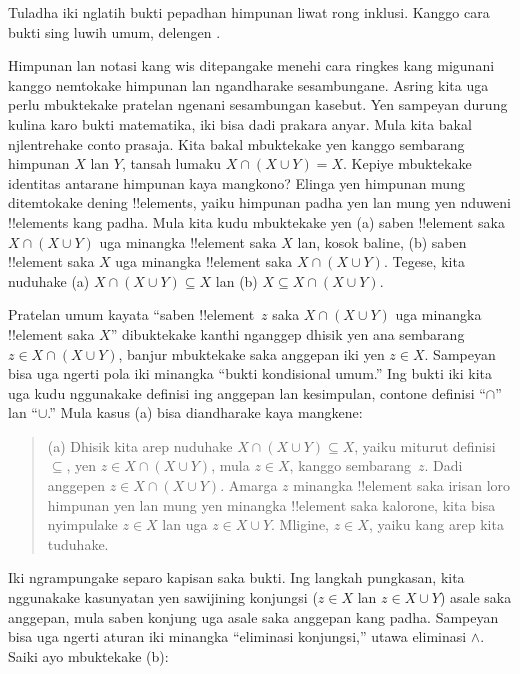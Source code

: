 \documentclass[../../../include/open-logic-section]{subfiles}
\begin{document}

\begin{editorial}
Tuladha iki nglatih bukti pepadhan himpunan liwat rong inklusi.
Kanggo cara bukti sing luwih umum, delengen .
\end{editorial}

\begin{explain}
Himpunan lan notasi kang wis ditepangake menehi cara ringkes kang
migunani kanggo nemtokake himpunan lan ngandharake sesambungane.
Asring kita uga perlu mbuktekake pratelan ngenani sesambungan kasebut.
Yen sampeyan durung kulina karo bukti matematika, iki bisa dadi
prakara anyar. Mula kita bakal njlentrehake conto prasaja.
Kita bakal mbuktekake yen kanggo sembarang himpunan $X$ lan $Y$,
tansah lumaku $X \cap (X \cup Y) = X$. Kepiye mbuktekake
identitas antarane himpunan kaya mangkono? Elinga yen himpunan mung
ditemtokake dening !!{element}s, yaiku himpunan padha yen lan mung
yen nduweni !!{element}s kang padha. Mula kita kudu mbuktekake yen
(a) saben !!{element} saka $X \cap (X \cup Y)$ uga minangka
!!{element} saka $X$ lan, kosok baline, (b) saben !!{element}
saka $X$ uga minangka !!{element} saka $X \cap (X \cup Y)$.
Tegese, kita nuduhake (a) $X \cap (X \cup Y) \subseteq X$ lan
(b) $X \subseteq X \cap (X \cup Y)$.

Pratelan umum kayata ``saben !!{element}~$z$ saka $X \cap (X
\cup Y)$ uga minangka !!{element} saka $X$'' dibuktekake kanthi
nganggep dhisik yen ana sembarang $z \in X \cap (X \cup Y)$,
banjur mbuktekake saka anggepan iki yen $z \in X$.
Sampeyan bisa uga ngerti pola iki minangka ``bukti kondisional umum.''
Ing bukti iki kita uga kudu nggunakake definisi ing anggepan lan
kesimpulan, contone definisi ``$\cap$'' lan ``$\cup$.''
Mula kasus (a) bisa diandharake kaya mangkene:

\begin{quote}
(a) Dhisik kita arep nuduhake $X \cap (X \cup Y) \subseteq X$,
yaiku miturut definisi $\subseteq$, yen $z \in X \cap (X \cup Y)$,
mula $z \in X$, kanggo sembarang~$z$. Dadi anggepen
$z \in X \cap (X \cup Y)$. Amarga $z$ minangka !!{element} saka
irisan loro himpunan yen lan mung yen minangka !!{element} saka
kalorone, kita bisa nyimpulake $z \in X$ lan uga $z \in X \cup Y$.
Mligine, $z \in X$, yaiku kang arep kita tuduhake.
\end{quote}

Iki ngrampungake separo kapisan saka bukti. Ing langkah pungkasan,
kita nggunakake kasunyatan yen sawijining konjungsi ($z \in X$ lan
$z \in X \cup Y$) asale saka anggepan, mula saben konjung uga
asale saka anggepan kang padha. Sampeyan bisa uga ngerti aturan iki
minangka ``eliminasi konjungsi,'' utawa eliminasi $\land$.
Saiki ayo mbuktekake (b):


\end{explain}
\end{document}

